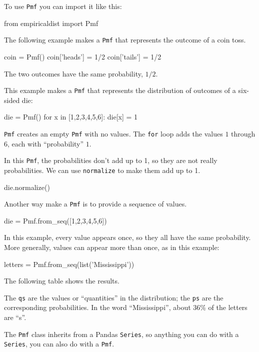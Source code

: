 \documentclass[12pt]{book}
\theoremstyle{exercise}
\newcommand{\py}[1]{{\tt #1}}%
\begin{document}
To use \py{Pmf} you can import it like this:

\begin{code}
from empiricaldist import Pmf
\end{code}

The following example makes a \py{Pmf} that represents the outcome of a coin toss.

\begin{code}
coin = Pmf()
coin['heads'] = 1/2
coin['tails'] = 1/2
\end{code}

The two outcomes have the same probability, $1/2$.

This example makes a \py{Pmf} that represents the distribution
of outcomes of a six-sided die:

\begin{code}
die = Pmf()
for x in [1,2,3,4,5,6]:
    die[x] = 1
\end{code}

\py{Pmf} creates an empty \py{Pmf} with no values.
The \py{for} loop adds the values $1$ through $6$, each with ``probability'' $1$.

In this \py{Pmf}, the probabilities don't add up to 1, so they are not really probabilities.
We can use \py{normalize} to make them add up to 1.

\begin{code}
die.normalize()
\end{code}

Another way make a \py{Pmf} is to provide a sequence of values.

\begin{code}
die = Pmf.from_seq([1,2,3,4,5,6])
\end{code}

In this example, every value appears once, so they all have the same probability.
More generally, values can appear more than once, as in this example:

\begin{code}
letters = Pmf.from_seq(list('Mississippi'))
\end{code}

The following table shows the results.



The \py{qs} are the values or ``quantities'' in the distribution; the \py{ps} are the corresponding probabilities.  In the word ``Mississippi'', about 36\% of the letters are ``s''.

The \py{Pmf} class inherits from a Pandas \py{Series}, so anything you can do with a \py{Series}, you can also do with a \py{Pmf}.
\end{document}
